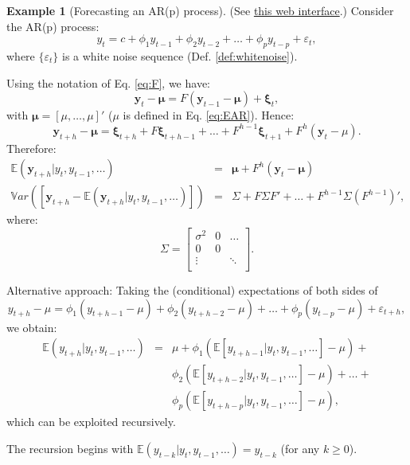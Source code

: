 \documentclass[
  12pt,
]{book}
\theoremstyle{definition}
\theoremstyle{definition}
\newtheorem{example}{Example}[chapter]
\theoremstyle{definition}
\theoremstyle{definition}
\theoremstyle{remark}
\begin{document}
\begin{example}[Forecasting an AR(p) process]
\protect\hypertarget{exm:fcstARp}{}\label{exm:fcstARp}(See \href{https://jrenne.shinyapps.io/ARpFcst}{this web interface}.) Consider the AR(p) process:
\[
y_t = c + \phi_1 y_{t-1} + \phi_2 y_{t-2} + \dots + \phi_p y_{t-p} + \varepsilon_t,
\]
where \(\{\varepsilon_t\}\) is a white noise sequence (Def. \ref{def:whitenoise}).

Using the notation of Eq. \eqref{eq:F}, we have:
\[
\mathbf{y}_t - \boldsymbol\mu = F (\mathbf{y}_{t-1}- \boldsymbol\mu) + \boldsymbol\xi_t,
\]
with \(\boldsymbol\mu = [\mu,\dots,\mu]'\) (\(\mu\) is defined in Eq. \eqref{eq:EAR}). Hence:
\[
\mathbf{y}_{t+h} - \boldsymbol\mu = \boldsymbol\xi_{t+h} + F \boldsymbol\xi_{t+h-1} + \dots + F^{h-1} \boldsymbol\xi_{t+1} + F^h (\mathbf{y}_{t}- \mu).
\]
Therefore:
\begin{eqnarray*}
\mathbb{E}(\mathbf{y}_{t+h}|y_{t},y_{t-1},\dots) &=& \boldsymbol\mu + F^{h}(\mathbf{y}_t - \boldsymbol\mu)\\
\mathbb{V}ar\left( [\mathbf{y}_{t+h} - \mathbb{E}(\mathbf{y}_{t+h}|y_{t},y_{t-1},\dots)] \right) &=& \Sigma + F\Sigma F' + \dots + F^{h-1}\Sigma (F^{h-1})',
\end{eqnarray*}
where:
\[
\Sigma = \left[
\begin{array}{ccc}
\sigma^2  & 0& \dots\\
0  & 0 & \\
\vdots  & & \ddots \\
\end{array}
\right].
\]

Alternative approach: Taking the (conditional) expectations of both sides of
\[
y_{t+h} - \mu = \phi_1 (y_{t+h-1} - \mu) + \phi_2 (y_{t+h-2} - \mu) + \dots + \phi_p (y_{t-p} - \mu) + \varepsilon_{t+h},
\]
we obtain:
\begin{eqnarray*}
\mathbb{E}(y_{t+h}|y_{t},y_{t-1},\dots) &=& \mu + \phi_1\left(\mathbb{E}[y_{t+h-1}|y_{t},y_{t-1},\dots] - \mu\right)+\\
&&\phi_2\left(\mathbb{E}[y_{t+h-2}|y_{t},y_{t-1},\dots] - \mu\right) + \dots +\\
&& \phi_p\left(\mathbb{E}[y_{t+h-p}|y_{t},y_{t-1},\dots] - \mu\right),
\end{eqnarray*}
which can be exploited recursively.

The recursion begins with \(\mathbb{E}(y_{t-k}|y_{t},y_{t-1},\dots)=y_{t-k}\) (for any \(k \ge 0\)).
\end{example}
\end{document}
